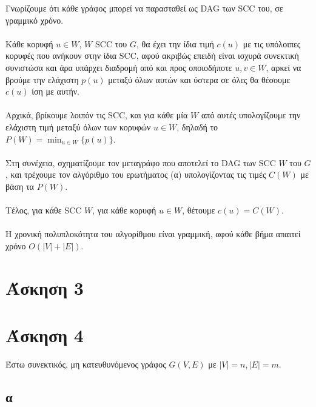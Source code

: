 \documentclass[12pt,a4paper]{article}
\begin{document}
  Γνωρίζουμε ότι κάθε γράφος μπορεί να παρασταθεί ως {\latintext DAG} των 
  {\latintext SCC} του, σε γραμμικό χρόνο.
  \\
  \\
  Κάθε κορυφή \( u \in W \), \( W \) {\latintext SCC} του \( G \),
  θα έχει την ίδια τιμή \( c(u) \) με τις υπόλοιπες κορυφές που
  ανήκουν στην ίδια {\latintext SCC}, αφού ακριβώς επειδή είναι ισχυρά συνεκτική
  συνιστώσα και άρα υπάρχει διαδρομή από και προς οποιοδήποτε
  \( u, v \in W \), αρκεί να
  βρούμε την ελάχιστη \( p(u) \) μεταξύ όλων αυτών και ύστερα σε όλες θα θέσουμε
  \( c(u) \) ίση με αυτήν.
  \\
  \\
  Αρχικά, βρίκουμε λοιπόν τις {\latintext SCC}, και για κάθε μία \( W \) από
  αυτές υπολογίζουμε την ελάχιστη τιμή μεταξύ όλων των κορυφών \( u \in W \),
  δηλαδή το \( P(W) = \min_{u \in W}\{ p(u) \}\).
  \\
  \\
  Στη συνέχεια, σχηματίζουμε τον μεταγράφο που αποτελεί το {\latintext DAG} των 
  {\latintext SCC \( W \)} του \( G \), και τρέχουμε τον αλγόριθμο του
  ερωτήματος (α) υπολογίζοντας τις τιμές \( C(W) \) με βάση τα \( P(W) \).
  \\
  \\
  Tέλος, για κάθε {\latintext SCC \(W\)}, για κάθε κορυφή \(u \in W \), θέτουμε
  \( c(u) = C(W) \).
  \\
  \\
  Η χρονική πολυπλοκότητα του αλγορίθμου είναι γραμμική, αφού κάθε βήμα απαιτεί
  χρόνο \( Ο(|V| + |E|) \).

  \section{Άσκηση 3}
  
  \section{Άσκηση 4}

  Έστω συνεκτικός, μη κατευθυνόμενος γράφος \( G(V, E) \) με \( |V| = n,
  |E| = m \).

  \subsection{α}
\end{document}
